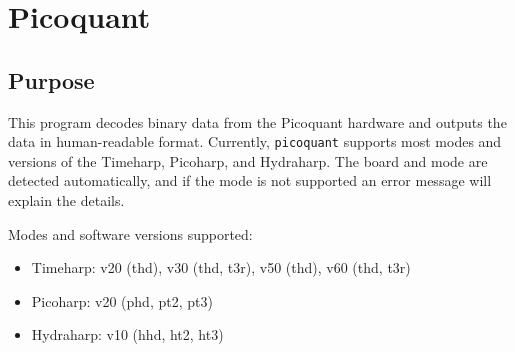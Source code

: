 \documentclass{article}
\newcommand{\braces}[1]{\ensuremath{\left\lbrace #1 \right\rbrace}}
\newcommand{\picoquant}{\texttt{picoquant}}
\newcommand{\gn}[1]{\ensuremath{g^{(#1)}}}
\newcommand{\abs}[1]{\ensuremath{\left|#1\right|}}
\begin{document}
%

\section{Picoquant}
\subsection{Purpose}
This program decodes binary data from the Picoquant hardware and outputs the data in human-readable format. Currently, \picoquant{} supports most modes and versions of the Timeharp, Picoharp, and Hydraharp. The board and mode are detected automatically, and if the mode is not supported an error message will explain the details.

Modes and software versions supported:
\begin{itemize}
\item Timeharp: v20 (thd), v30 (thd, t3r), v50 (thd), v60 (thd, t3r)
\item Picoharp: v20 (phd, pt2, pt3)
\item Hydraharp: v10 (hhd, ht2, ht3)
\end{itemize}
\end{document}

